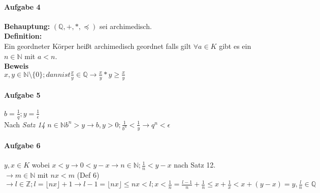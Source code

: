 \documentclass[10pt,a4paper]{scrartcl}
\begin{document}
\paragraph*{Aufgabe 4}
\begin{tabbing}
\textbf{Behauptung:} $(\mathbb{Q},+,*,\preceq)$ sei archimedisch.\\

\textbf{Definition:}\\
Ein geordneter Körper heißt archimedisch geordnet falls gilt $\forall a\in K$ gibt es ein $n\in \mathbb{N}$ mit $a<n$.\\

\textbf{Beweis}\\
$x,y\in \mathbb{N}\setminus \{0\}; dann ist \frac{x}{y}\in \mathbb{Q}\rightarrow \frac{x}{y}*y\geq \frac{x}{y}$
\end{tabbing}

\paragraph*{Aufgabe 5}
\begin{tabbing}
$b=\frac{1}{q}; y=\frac{1}{\epsilon}$\\
Nach \textit{Satz 14} $n\in \mathbb{N} b^{n}>y\rightarrow b,y>0; \frac{1}{b^{n}}<\frac{1}{y}\rightarrow q^{n}<\epsilon$\\ 
\end{tabbing}

\paragraph*{Aufgabe 6}
\begin{tabbing}
$y,x\in K$ wobei $x<y\rightarrow 0<y-x\rightarrow n\in\mathbb{N}; \frac{1}{n} <y-x$ nach Satz 12.\\
$\rightarrow m\in \mathbb{N}$ mit $nx<m$ (Def 6) $\rightarrow l\in \mathbb{Z}; l=\lfloor nx\rfloor +1\rightarrow l-1=\lfloor nx\rfloor\leq nx<l; x<\frac{1}{n} =\frac{l-1}{n} +\frac{1}{n}\leq x+\frac{1}{x} < x+(y-x)=y,\frac{l}{n}\in\mathbb{Q}$\\
\end{tabbing}
\end{document}
